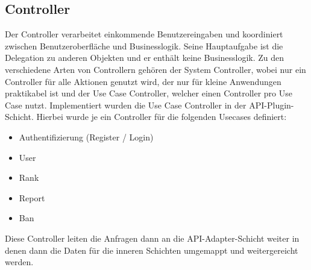 \subsection{Controller}
Der Controller verarbeitet einkommende Benutzereingaben und koordiniert zwischen Benutzeroberfläche und Businesslogik.
Seine Hauptaufgabe ist die Delegation zu anderen Objekten und er enthält keine Businesslogik.
Zu den verschiedene Arten von Controllern gehören der System Controller, wobei nur ein Controller für alle Aktionen genutzt wird, der nur für kleine Anwendungen praktikabel ist
und der Use Case Controller, welcher einen Controller pro Use Case nutzt.
Implementiert wurden die Use Case Controller in der API-Plugin-Schicht.
Hierbei wurde je ein Controller für die folgenden Usecases definiert:

\begin{itemize}
    \item Authentifizierung (Register / Login)
    \item User
    \item Rank
    \item Report
    \item Ban
\end{itemize}

Diese Controller leiten die Anfragen dann an die API-Adapter-Schicht weiter in denen dann die Daten für die inneren Schichten umgemappt und weitergereicht werden.

